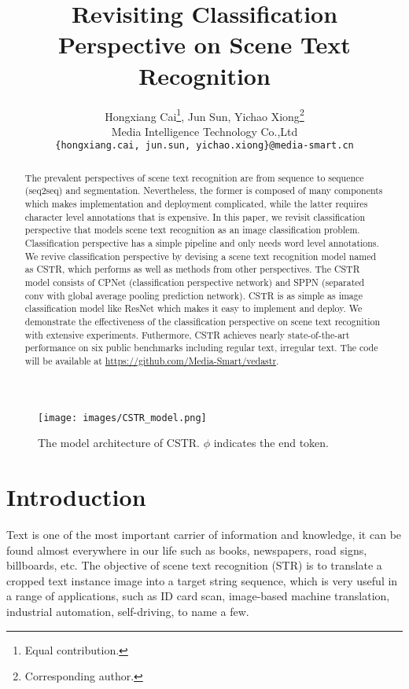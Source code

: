 \documentclass[final]{cvpr}
\begin{document}
\title{Revisiting Classification Perspective on Scene Text Recognition}

\author{
 Hongxiang Cai\thanks{Equal contribution.}, Jun Sun\footnotemark[1] , Yichao Xiong\thanks{Corresponding author.} \\
  Media Intelligence Technology Co.,Ltd\\
  \texttt{\small \{hongxiang.cai, jun.sun, yichao.xiong\}@media-smart.cn} 
}

\maketitle

\begin{figure*}[ht]
\centering
  \texttt{[image: images/CSTR\_model.png]}
\centering
\caption{The model architecture of CSTR. $\phi$ indicates the end token.}
\label{fig.CSTR_model}
\end{figure*}

\begin{abstract}
The prevalent perspectives of scene text recognition are from sequence to sequence (seq2seq) and segmentation. Nevertheless, the former is composed of many components which makes implementation and deployment complicated, while the latter requires character level annotations that is expensive.
In this paper, we revisit classification perspective that models scene text recognition as an image classification problem. Classification perspective has a simple pipeline and only needs word level annotations. We revive classification perspective by devising a scene text recognition model named as CSTR, which performs as well as methods from other perspectives.
The CSTR model consists of CPNet (classification perspective network) and SPPN (separated conv with global average pooling prediction network). 
CSTR is as simple as image classification model like ResNet \cite{he2016deep} which makes it easy to implement and deploy.
We demonstrate the effectiveness of the classification perspective on scene text recognition with extensive experiments. Futhermore, CSTR achieves nearly state-of-the-art performance on six public benchmarks including regular text, irregular text. The code will be available at \url{https://github.com/Media-Smart/vedastr}.
\end{abstract}

\section{Introduction}
Text is one of the most important carrier of information and knowledge, it can be found almost everywhere in our life such as books, newspapers, road signs, billboards, etc. The objective of scene text recognition (STR) is to translate a cropped text instance image into a target string sequence, which is very useful in a range of applications, such as ID card scan, image-based machine translation, industrial automation, self-driving, to name a few. 
\end{document}

